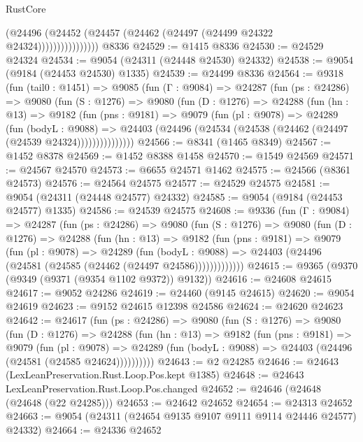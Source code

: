 \begin{lexlean}{RustCore}
\begin{coremodule}
                        (@24496
                          (@24452 (@24457 (@24462 (@24497 (@24499 @24322 @24324))))))))))))))))
    @8336
@24529 := @1415 @8336
@24530 := @24529 @24324
@24534 := @9054 (@24311 (@24448 @24530) @24332)
@24538 := @9054 (@9184 (@24453 @24530) @1335)
@24539 := @24499 @8336
@24564 := @9318
    (fun (tail0 : @1451) =>
    @9085
      (fun (Γ : @9084) =>
      @24287
        (fun (ps : @24286) =>
        @9080
          (fun (S : @1276) =>
          @9080
            (fun (D : @1276) =>
            @24288
              (fun (hn : @13) =>
              @9182
                (fun (pns : @9181) =>
                @9079
                  (fun (pl : @9078) =>
                  @24289
                    (fun (bodyL : @9088) =>
                    @24403 (@24496 (@24534 (@24538 (@24462 (@24497 (@24539 @24324)))))))))))))))
@24566 := @8341 (@1465 @8349)
@24567 := @1452 @8378
@24569 := @1452 @8388 @1458
@24570 := @1549 @24569
@24571 := @24567 @24570
@24573 := @6655 @24571 @1462
@24575 := @24566 (@8361 @24573)
@24576 := @24564 @24575
@24577 := @24529 @24575
@24581 := @9054 (@24311 (@24448 @24577) @24332)
@24585 := @9054 (@9184 (@24453 @24577) @1335)
@24586 := @24539 @24575
@24608 := @9336
    (fun (Γ : @9084) =>
    @24287
      (fun (ps : @24286) =>
      @9080
        (fun (S : @1276) =>
        @9080
          (fun (D : @1276) =>
          @24288
            (fun (hn : @13) =>
            @9182
              (fun (pns : @9181) =>
              @9079
                (fun (pl : @9078) =>
                @24289
                  (fun (bodyL : @9088) =>
                  @24403 (@24496 (@24581 (@24585 (@24462 (@24497 @24586)))))))))))))
@24615 := @9365 (@9370 (@9349 (@9371 (@9354 @1102 @9372)) @9132))
@24616 := @24608 @24615
@24617 := @9052 @24286
@24619 := @24460 (@9145 @24615)
@24620 := @9054 @24619
@24623 := @9152 @24615 @12398 @24586
@24624 := @24620 @24623
@24642 := @24617
    (fun (ps : @24286) =>
    @9080
      (fun (S : @1276) =>
      @9080
        (fun (D : @1276) =>
        @24288
          (fun (hn : @13) =>
          @9182
            (fun (pns : @9181) =>
            @9079
              (fun (pl : @9078) =>
              @24289 (fun (bodyL : @9088) => @24403 (@24496 (@24581 (@24585 @24624))))))))))
@24643 := @2 @24285
@24646 := @24643 (LexLeanPreservation.Rust.Loop.Pos.kept @1385)
@24648 := @24643 LexLeanPreservation.Rust.Loop.Pos.changed
@24652 := @24646 (@24648 (@24648 (@22 @24285)))
@24653 := @24642 @24652
@24654 := @24313 @24652
@24663 := @9054 (@24311 (@24654 @9135 @9107 @9111 @9114 @24446 @24577) @24332)
@24664 := @24336 @24652

\end{coremodule}
\end{lexlean}
